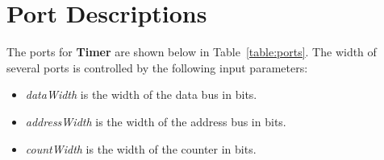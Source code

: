 \section{Port Descriptions}

The ports for \textbf{Timer} are shown below in Table~\ref{table:ports}. The width of several ports is controlled by the following input parameters:

\begin{itemize}[noitemsep]
  \item \textit{dataWidth} is the width of the data bus in bits.
  \item \textit{addressWidth} is the width of the address bus in bits.
  \item \textit{countWidth} is the width of the counter in bits.
\end{itemize}

